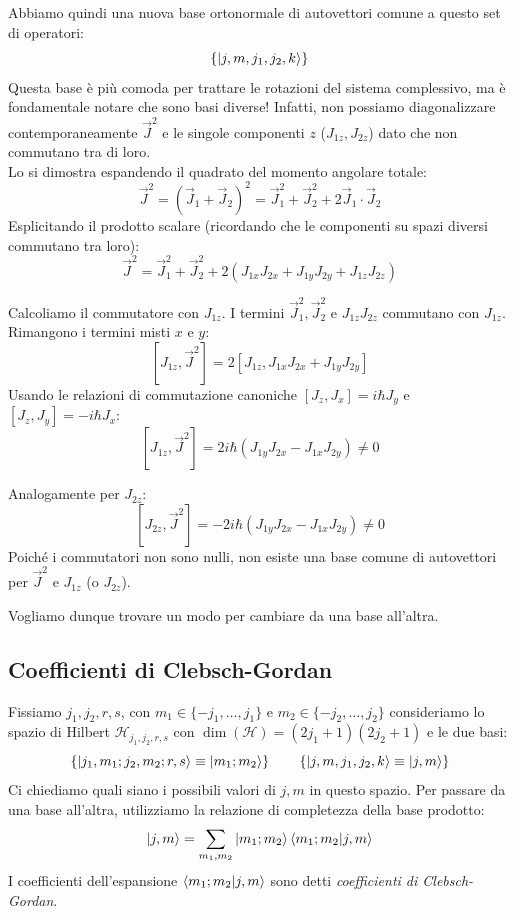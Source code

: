Abbiamo quindi una nuova base ortonormale di autovettori comune a questo set di operatori:
\[
    \left\{ \ket{j, m, j_1, j_2, k} \right\}
\]
Questa base è più comoda per trattare le rotazioni del sistema complessivo, ma è fondamentale notare che sono basi diverse!
Infatti, non possiamo diagonalizzare contemporaneamente \( \vec{J}^2 \) e le singole componenti \( z \) (\( J_{1z}, J_{2z} \)) dato che non commutano tra di loro. \\
Lo si dimostra espandendo il quadrato del momento angolare totale:
\[
    \vec{J}^2 = (\vec{J}_1 + \vec{J}_2)^2 = \vec{J}_1^2 + \vec{J}_2^2 + 2\vec{J}_1 \cdot \vec{J}_2
\]
Esplicitando il prodotto scalare (ricordando che le componenti su spazi diversi commutano tra loro):
\[
    \vec{J}^2 = \vec{J}_1^2 + \vec{J}_2^2 + 2(J_{1x}J_{2x} + J_{1y}J_{2y} + J_{1z}J_{2z})
\]

Calcoliamo il commutatore con \( J_{1z} \). I termini \( \vec{J}_1^2, \vec{J}_2^2 \) e \( J_{1z}J_{2z} \) commutano con \( J_{1z} \). Rimangono i termini misti \( x \) e \( y \):
\[
    [J_{1z}, \vec{J}^2] = 2 [J_{1z}, J_{1x}J_{2x} + J_{1y}J_{2y}]
\]
Usando le relazioni di commutazione canoniche \( [J_z, J_x] = i\hbar J_y \) e \( [J_z, J_y] = -i\hbar J_x \):
\[
    [J_{1z}, \vec{J}^2] = 2i\hbar (J_{1y}J_{2x} - J_{1x}J_{2y}) \neq 0
\]

Analogamente per \( J_{2z} \):
\[
    [J_{2z}, \vec{J}^2] = -2i\hbar (J_{1y}J_{2x} - J_{1x}J_{2y}) \neq 0
\]
Poiché i commutatori non sono nulli, non esiste una base comune di autovettori per \( \vec{J}^2 \) e \( J_{1z} \) (o \( J_{2z} \)).



Vogliamo dunque trovare un modo per cambiare da una base all'altra.

\subsection{Coefficienti di Clebsch-Gordan}

Fissiamo \(j_1, j_2, r, s\), con \(m_1 \in \{-j_1, \dots, j_1\} \) e \( m_2 \in \{-j_2, \dots, j_2\}\) 
consideriamo lo spazio di Hilbert \(\mathcal{H}_{j_1, j_2, r, s} \) con \(\dim(\mathcal{H}) = (2j_1+1)(2j_2+1)\) e le due basi:
\begin{equation}
    \left\{ \ket{j_1, m_1; j_2, m_2; r, s} \equiv \ket{m_1; m_2}\right\} \qquad\left\{ \ket{j, m, j_1, j_2, k}\equiv \ket{j, m}\right\}
\end{equation}
Ci chiediamo quali siano i possibili valori di $j, m$ in questo spazio. Per passare da una base all'altra, utilizziamo la relazione di completezza della base prodotto:
\[
    \ket{j, m} = \sum_{m_1, m_2} \ket{m_1; m_2} \braket{m_1; m_2}{j, m}
\]
I coefficienti dell'espansione $\braket{m_1; m_2}{j, m}$ sono detti \textit{coefficienti di Clebsch-Gordan}.

